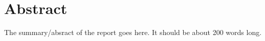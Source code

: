 \chapter*{Abstract} %
\label{cha:abstract}

The summary/absract of the report goes here. It should be about 200 words long.

\blindtext

